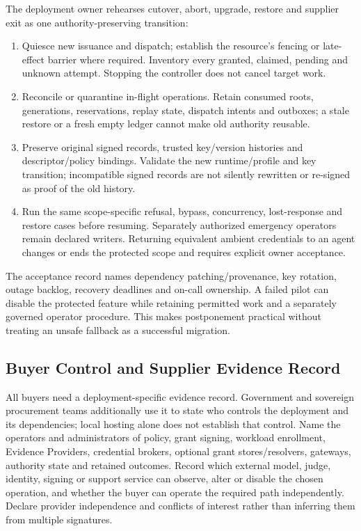 The deployment owner rehearses cutover, abort, upgrade, restore and supplier
exit as one authority-preserving transition:
\begin{enumerate}
\item Quiesce new issuance and dispatch; establish the resource's fencing or
late-effect barrier where required. Inventory every granted, claimed, pending
and unknown attempt. Stopping the controller does not cancel target work.
\item Reconcile or quarantine in-flight operations. Retain consumed roots,
generations, reservations, replay state, dispatch intents and outboxes; a stale
restore or a fresh empty ledger cannot make old authority reusable.
\item Preserve original signed records, trusted key/version histories and
descriptor/policy bindings. Validate the new runtime/profile and key transition;
incompatible signed records are not silently rewritten or re-signed as proof
of the old history.
\item Run the same scope-specific refusal, bypass, concurrency, lost-response
and restore cases before resuming. Separately authorized emergency operators
remain declared writers. Returning equivalent ambient credentials to an agent
changes or ends the protected scope and requires explicit owner acceptance.
\end{enumerate}

The acceptance record names dependency patching/provenance, key rotation,
outage backlog, recovery deadlines and on-call ownership. A failed pilot can
disable the protected feature while retaining permitted work and a separately
governed operator procedure. This makes postponement practical without treating
an unsafe fallback as a successful migration.

\subsection{Buyer Control and Supplier Evidence Record}
\label{sec:buyer-control-record}

All buyers need a deployment-specific evidence record. Government and
sovereign procurement teams additionally use it to state who controls the
deployment and its dependencies; local hosting alone does not establish that
control. Name the operators and administrators of policy, grant signing,
workload enrollment, Evidence Providers, credential brokers, optional grant
stores/resolvers, gateways,
authority state and retained outcomes. Record which external model, judge,
identity, signing or support service can observe, alter or disable the chosen
operation, and whether the buyer can operate the required path independently.
Declare provider independence and conflicts of interest rather than inferring
them from multiple signatures.

